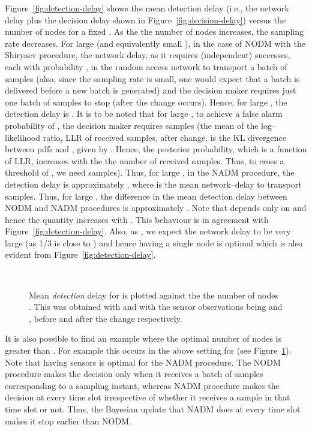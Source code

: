 \documentclass[acmtosn]{acmtrans2m}
\begin{document}
Figure~\ref{fig:detection-delay} shows the mean detection delay (i.e., the network 
delay plus the decision delay shown in Figure~\ref{fig:decision-delay}) versus the 
number of nodes  for a fixed . As the the number of nodes  
increases, the sampling rate  decreases. For large  (and equivalently 
small ), in the case of {\sf NODM} with the Shiryaev procedure, the network delay, 
 as it requires  (independent) successes, each with 
probability , in the random access network to transport a batch of  samples 
(also, since the sampling rate  is small, one would expect that a batch is delivered 
before a new batch is generated) and the decision maker requires just one batch of  
samples to stop (after the change occurs). Hence, for large , the detection delay is 
.
It is to be noted that for large , to achieve a false 
alarm probability of , the decision maker requires  samples
(the mean of the log--likelihood ratio, LLR of received samples, after change, is the 
KL divergence between pdfs  and , given by .
Hence, the posterior probability, which is a function of LLR, increases with the the number of received samples. Thus, 
to cross a threshold of , we need  samples). Thus, for large 
, in the {\sf NADM} procedure, the detection delay is approximately 
, where  is the mean 
network--delay to transport  samples. Thus, for large , the 
difference in the mean detection 
delay between {\sf NODM} and {\sf NADM} procedures is approximately 
. Note that  depends only on  
and hence the quantity  increases with . This 
behaviour is in agreement with Figure~\ref{fig:detection-delay}. Also, as 
, we expect the network delay to be very large (as 1/3 is close to 
) and hence having a single node is optimal which is also evident from 
Figure~\ref{fig:detection-delay}. 



 
 \begin{figure}
   \centering \ 
   \caption{Mean \emph{detection} delay for  is plotted
     against the the number of nodes . This was obtained with 
      and with the sensor observations
     being  and , before and after the
     change respectively.}
   \label{fig:decision-delay-01}
 \end{figure}
It is also possible to find an example where the optimal number of
nodes is greater than . For example this occurs in the above
setting for  (see Figure~\ref{fig:decision-delay-01}).
Note that having  sensors is optimal for the {\sf NADM} procedure. 
The {\sf NODM} procedure makes the decision only when it receives a batch
of  samples corresponding to a sampling instant, whereas {\sf NADM}
procedure makes the decision at every time slot irrespective of 
whether it receives a sample in that time slot or not. Thus, the 
Bayesian update that {\sf NADM} does at every time slot makes it stop 
earlier than {\sf NODM}.
\end{document}

